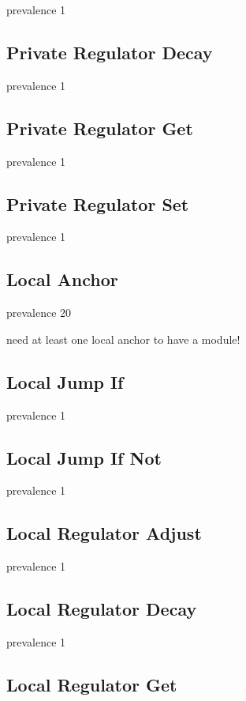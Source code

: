 prevalence 1

\subsection{Private Regulator Decay}

prevalence 1

\subsection{Private Regulator Get}

prevalence 1

\subsection{Private Regulator Set}

prevalence 1

\subsection{Local Anchor}

prevalence 20

need at least one local anchor to have a module!

\subsection{Local Jump If}

prevalence 1

\subsection{Local Jump If Not}

prevalence 1

\subsection{Local Regulator Adjust}

prevalence 1

\subsection{Local Regulator Decay}

prevalence 1

\subsection{Local Regulator Get}

